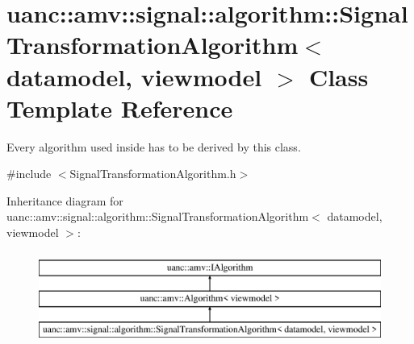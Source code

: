 \hypertarget{classuanc_1_1amv_1_1signal_1_1algorithm_1_1_signal_transformation_algorithm}{}\section{uanc\+:\+:amv\+:\+:signal\+:\+:algorithm\+:\+:Signal\+Transformation\+Algorithm$<$ datamodel, viewmodel $>$ Class Template Reference}
\label{classuanc_1_1amv_1_1signal_1_1algorithm_1_1_signal_transformation_algorithm}


Every algorithm used inside has to be derived by this class.  




{\ttfamily \#include $<$Signal\+Transformation\+Algorithm.\+h$>$}

Inheritance diagram for uanc\+:\+:amv\+:\+:signal\+:\+:algorithm\+:\+:Signal\+Transformation\+Algorithm$<$ datamodel, viewmodel $>$\+:\begin{figure}[H]
\begin{center}
\leavevmode
\includegraphics[height=3.000000cm]{classuanc_1_1amv_1_1signal_1_1algorithm_1_1_signal_transformation_algorithm}
\end{center}
\end{figure}
